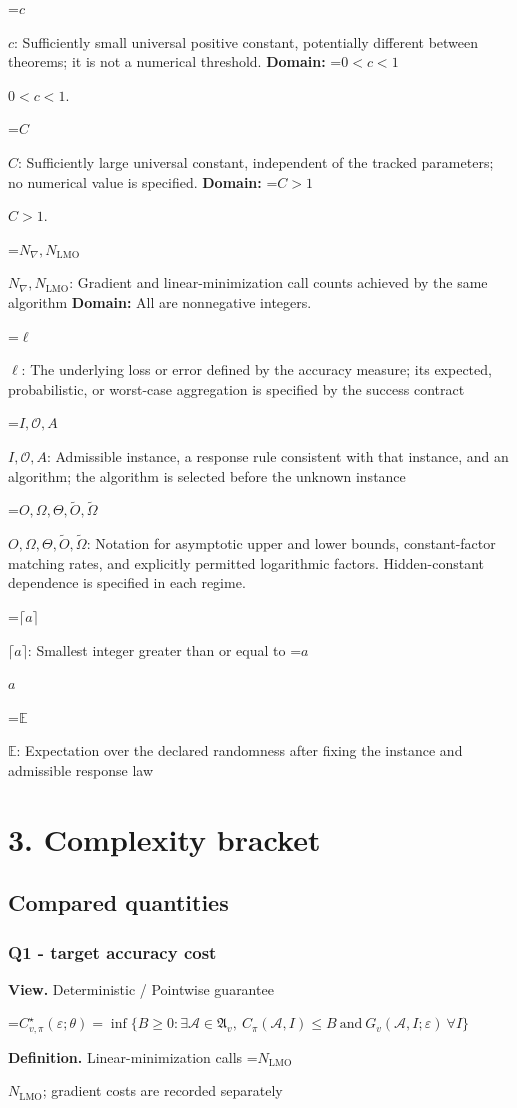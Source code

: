\documentclass[10pt,a4paper]{article}
\newcommand{\AtlasMath}[1]{\par\begingroup\centering\setbox0=\hbox{$\displaystyle #1$}\ifdim\wd0>1.4\linewidth\typeout{ATLAS WIDE FORMULA: \the\wd0}\fi\ifdim\wd0>\linewidth\resizebox{\linewidth}{!}{\box0}\else\box0\fi\par\endgroup}
\newcommand{\AtlasInlineMath}[1]{\begingroup\setbox0=\hbox{$#1$}\ifdim\wd0>.4\linewidth\endgroup\AtlasMath{#1}\else\endgroup$#1$\fi}
\begin{document}
\AtlasInlineMath{c}: Sufficiently small universal positive constant, potentially different between theorems; it is not a numerical threshold. \textbf{Domain:} \AtlasInlineMath{0<c<1}.

\AtlasInlineMath{C}: Sufficiently large universal constant, independent of the tracked parameters; no numerical value is specified. \textbf{Domain:} \AtlasInlineMath{C>1}.

\AtlasInlineMath{N_{\nabla},N_{\mathrm{LMO}}}: Gradient and linear-minimization call counts achieved by the same algorithm \textbf{Domain:} All are nonnegative integers.

\AtlasInlineMath{\ell}: The underlying loss or error defined by the accuracy measure; its expected, probabilistic, or worst-case aggregation is specified by the success contract

\AtlasInlineMath{I,\mathcal{O},A}: Admissible instance, a response rule consistent with that instance, and an algorithm; the algorithm is selected before the unknown instance

\AtlasInlineMath{O,\Omega,\Theta,\widetilde{O},\widetilde\Omega}: Notation for asymptotic upper and lower bounds, constant-factor matching rates, and explicitly permitted logarithmic factors. Hidden-constant dependence is specified in each regime.

\AtlasInlineMath{\lceil a\rceil}: Smallest integer greater than or equal to \AtlasInlineMath{a}

\AtlasInlineMath{\mathbb{E}}: Expectation over the declared randomness after fixing the instance and admissible response law

\section{3. Complexity bracket}
\subsection{Compared quantities}
\subsubsection{Q1 - target accuracy cost}
\textbf{View.} Deterministic / Pointwise guarantee

\AtlasMath{C^\star_{v,\pi}(\varepsilon;\theta)=\inf\{B\ge0:\exists\mathcal A\in\mathfrak A_v,\ C_\pi(\mathcal A,I)\le B\ \text{and}\ G_v(\mathcal A,I;\varepsilon)\ \forall I\}}
\textbf{Definition.} Linear-minimization calls \AtlasInlineMath{N_{\mathrm{LMO}}}; gradient costs are recorded separately
\end{document}
